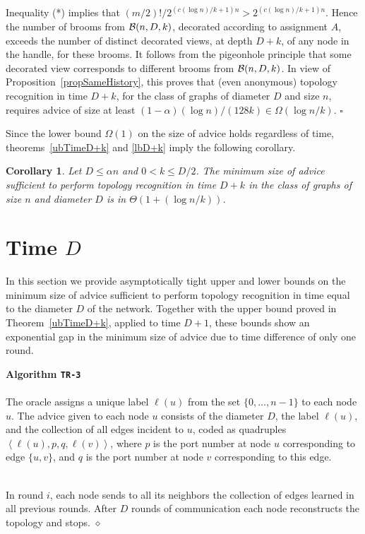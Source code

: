 \documentclass{article}
\newcommand{\cB}{{\cal B}}
\newcommand*{\qed}{\hfill\ensuremath{\square}}
\newtheorem{corollary}{Corollary}[section]
\newenvironment{proof}{\noindent{\bf Proof:}}{\qed}
\newcommand{\algo}[1]{
\medskip
\noindent \textbf{Algorithm {\tt #1}}\\
\nopagebreak}
\newcommand{\procend}{\hfill $\diamond$\medskip}
\begin{document}
\begin{proof}
Inequality (*) implies that 
$(m/2)! / 2^{(c(\log n)/k +1 )n} > 2^{(c(\log n)/k +1 )n}$. Hence the number of brooms from $\cB(n,D,k)$, decorated according to assignment $A$, exceeds the number of distinct decorated views, at depth $D+k$, of any node in the handle, for these brooms. It follows {from the pigeonhole principle}  that some decorated view corresponds to different brooms from $\cB(n,D,k)$. In view of Proposition~\ref{propSameHistory}, this proves that (even anonymous) topology recognition in time $D+k$, for the class of graphs of diameter $D$ and size $n$, requires advice of size at least $(1-\alpha)(\log n) /(128k) \in \Omega(\log n/k)$.
\end{proof}

Since the lower bound $\Omega(1)$ on the size of advice holds regardless of time, 
theorems~\ref{ubTimeD+k} and \ref{lbD+k} imply the following corollary.

\begin{corollary}\label{corD+k}
Let $D\le  \alpha n$ and $0 < k \le  D/2$.
The minimum size of advice sufficient to perform topology recognition in time $D+k$ in the class of graphs of size $n$ and diameter $D$ is in $\Theta(1 + (\log n / k))$. 
\end{corollary}
\section{Time $D$}


In this section we provide asymptotically tight upper and lower bounds on the minimum size of advice sufficient to perform topology recognition in time equal to the diameter $D$ of the network.
Together with the upper bound proved in Theorem~\ref{ubTimeD+k}, applied to time $D+1$, these bounds show an exponential gap in the minimum size of advice due to time difference of only one round.

\algo{TR-3}
\\
The oracle assigns a unique label $\ell(u)$ from the set $\{0,\ldots, n-1\}$ to each node $u$.
The advice given to each node $u$ consists of the diameter $D$, the label $\ell(u)$, and the collection of all  edges incident to $u$, coded as quadruples $\left<\ell(u),p,q,\ell(v)\right>$, where $p$ is the port number at node $u$ corresponding to edge $\{u,v\}$, and $q$ is the port number at node $v$ corresponding to this edge.

\\
In round $i$, each node sends to all its neighbors the collection of edges learned in all previous rounds. 
After $D$ rounds of communication each node reconstructs the topology and stops.
\procend
\end{document}
